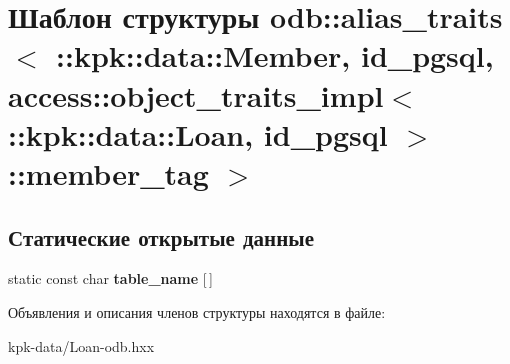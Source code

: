 \hypertarget{structodb_1_1alias__traits_3_01_01_01_01_01_01_01_01_01_01_01_01_01_01_01_01_01_01_1_1kpk_1_1dat5d080a5e7a5adc9367a2d79203d3e12d}{}\section{Шаблон структуры odb\+:\+:alias\+\_\+traits$<$ \+:\+:kpk\+:\+:data\+:\+:Member, id\+\_\+pgsql, access\+:\+:object\+\_\+traits\+\_\+impl$<$ \+:\+:kpk\+:\+:data\+:\+:Loan, id\+\_\+pgsql $>$\+:\+:member\+\_\+tag $>$}
\label{structodb_1_1alias__traits_3_01_01_01_01_01_01_01_01_01_01_01_01_01_01_01_01_01_01_1_1kpk_1_1dat5d080a5e7a5adc9367a2d79203d3e12d}
\subsection*{Статические открытые данные}
\begin{DoxyCompactItemize}
\item 
static const char {\bfseries table\+\_\+name} \mbox{[}$\,$\mbox{]}\hypertarget{structodb_1_1alias__traits_3_01_01_01_01_01_01_01_01_01_01_01_01_01_01_01_01_01_01_1_1kpk_1_1dat5d080a5e7a5adc9367a2d79203d3e12d_a94b98331cbd95f3f1b6077e8e4c0d134}{}\label{structodb_1_1alias__traits_3_01_01_01_01_01_01_01_01_01_01_01_01_01_01_01_01_01_01_1_1kpk_1_1dat5d080a5e7a5adc9367a2d79203d3e12d_a94b98331cbd95f3f1b6077e8e4c0d134}

\end{DoxyCompactItemize}


Объявления и описания членов структуры находятся в файле\+:\begin{DoxyCompactItemize}
\item 
kpk-\/data/Loan-\/odb.\+hxx\end{DoxyCompactItemize}
